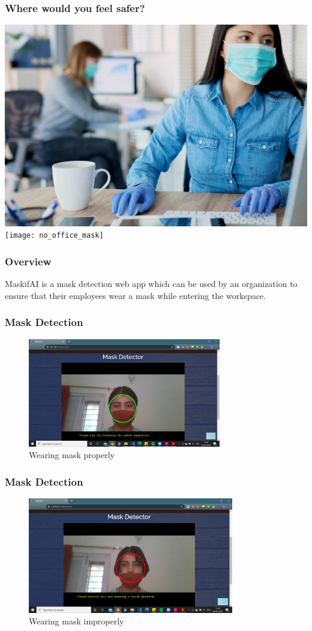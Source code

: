 \documentclass[14pt]{beamer}
\begin{document}
\begin{frame}
    \frametitle{Where would you feel safer?}
    \centering
    \includegraphics[width=4.5 cm,height=3.5 cm]{office_mask}
    \texttt{[image: no\_office\_mask]}
\end{frame}

\begin{frame}
    \frametitle{Overview}
    MaskifAI is a mask detection web app which can be used by an organization to ensure that their employees wear a mask while entering the workspace.
\end{frame}



\begin{frame}
    \frametitle{Mask Detection}
    \begin{figure}
    \caption{Wearing mask properly}
    \centering
    \includegraphics[width=0.75\textwidth]{mask}
    \end{figure}
\end{frame}

\begin{frame}
    \frametitle{Mask Detection}
    \begin{figure}
    \caption{Wearing mask improperly}
    \centering
    \includegraphics[width=0.8\textwidth]{improper_mask__}
    \end{figure}
\end{frame}
\end{document}
